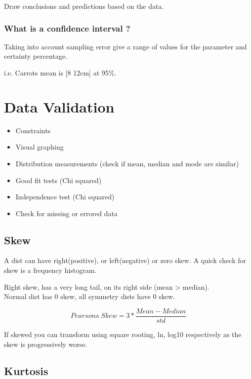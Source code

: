 \documentclass[11pt]{scrartcl} %
\begin{document}
Draw conclusions and predictions based on the data.

\subsubsection{What is a confidence interval ?}

Taking into account sampling error give a range of values for the parameter and certainty percentage.

i.e. Carrots mean is [8 12cm] at 95\%.

\section{Data Validation}

\begin{itemize}
	\item Constraints
	\item Visual graphing
	\item Distribution measurements (check if mean, median and mode are similar)
	\item Good fit tests (Chi squared)
	\item Independence test (Chi squared)
	\item Check for missing or errored data
\end{itemize}

\subsection{Skew}

A dist can have right(positive), or left(negative) or zero skew. A quick check for skew is a frequency histogram.

Right skew, has a very long tail, on its right side (mean > median).\\

Normal dist has 0 skew, all symmetry dists have 0 skew.

\begin{equation}
	Pearsons\; Skew = 3*\frac{Mean-Median}{std}
\end{equation}

If skewed you can transform using square rooting, ln, log10 respectively as the skew is progressively worse.

\subsection{Kurtosis}
\end{document}
